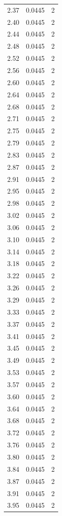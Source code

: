 \begin{longtable}{lrr}
  2.37 & 0.0445 & 2 \\
  2.40 & 0.0445 & 2 \\
  2.44 & 0.0445 & 2 \\
  2.48 & 0.0445 & 2 \\
  2.52 & 0.0445 & 2 \\
  2.56 & 0.0445 & 2 \\
  2.60 & 0.0445 & 2 \\
  2.64 & 0.0445 & 2 \\
  2.68 & 0.0445 & 2 \\
  2.71 & 0.0445 & 2 \\
  2.75 & 0.0445 & 2 \\
  2.79 & 0.0445 & 2 \\
  2.83 & 0.0445 & 2 \\
  2.87 & 0.0445 & 2 \\
  2.91 & 0.0445 & 2 \\
  2.95 & 0.0445 & 2 \\
  2.98 & 0.0445 & 2 \\
  3.02 & 0.0445 & 2 \\
  3.06 & 0.0445 & 2 \\
  3.10 & 0.0445 & 2 \\
  3.14 & 0.0445 & 2 \\
  3.18 & 0.0445 & 2 \\
  3.22 & 0.0445 & 2 \\
  3.26 & 0.0445 & 2 \\
  3.29 & 0.0445 & 2 \\
  3.33 & 0.0445 & 2 \\
  3.37 & 0.0445 & 2 \\
  3.41 & 0.0445 & 2 \\
  3.45 & 0.0445 & 2 \\
  3.49 & 0.0445 & 2 \\
  3.53 & 0.0445 & 2 \\
  3.57 & 0.0445 & 2 \\
  3.60 & 0.0445 & 2 \\
  3.64 & 0.0445 & 2 \\
  3.68 & 0.0445 & 2 \\
  3.72 & 0.0445 & 2 \\
  3.76 & 0.0445 & 2 \\
  3.80 & 0.0445 & 2 \\
  3.84 & 0.0445 & 2 \\
  3.87 & 0.0445 & 2 \\
  3.91 & 0.0445 & 2 \\
  3.95 & 0.0445 & 2 \\

\end{longtable}
